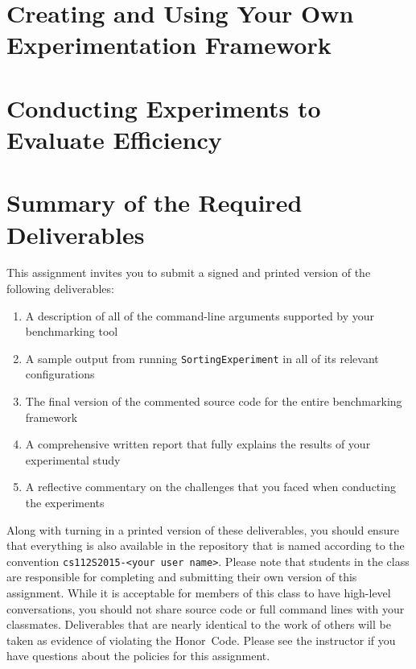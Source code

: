 \section*{Creating and Using Your Own Experimentation Framework}



\section*{Conducting Experiments to Evaluate Efficiency}



\section*{Summary of the Required Deliverables}

  This assignment invites you to submit a signed and printed version of the following deliverables:

  \begin{enumerate}
  \itemsep0pt
  \item A description of all of the command-line arguments supported by your benchmarking tool

  \item A sample output from running {\tt SortingExperiment} in all of its relevant configurations

  \item The final version of the commented source code for the entire benchmarking framework

  \item A comprehensive written report that fully explains the results of your experimental study

  \item A reflective commentary on the challenges that you faced when conducting the experiments

  \end{enumerate}

  Along with turning in a printed version of these deliverables, you should ensure that everything is also available in
  the repository that is named according to the convention {\tt cs112S2015-<your user name>}. Please note that students
  in the class are responsible for completing and submitting their own version of this assignment.    While it is
  acceptable for members of this class to have high-level conversations, you should not share source code or full
  command lines with your classmates.  Deliverables that are nearly identical to the work of others will be taken as
  evidence of violating the \mbox{Honor Code}.  Please see the instructor if you have questions about the policies for
  this assignment.

  
